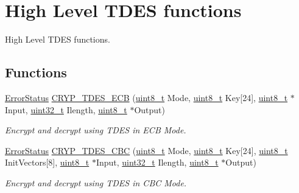 \hypertarget{group___c_r_y_p___group7}{\section{High Level T\-D\-E\-S functions}
\label{group___c_r_y_p___group7}
}


High Level T\-D\-E\-S functions.  


\subsection*{Functions}
\begin{DoxyCompactItemize}
\item 
\hyperlink{group___exported__types_ga8333b96c67f83cba354b3407fcbb6ee8}{Error\-Status} \hyperlink{group___c_r_y_p___group7_ga17c03ab4f0566fcbc3dd8c052e6f9886}{C\-R\-Y\-P\-\_\-\-T\-D\-E\-S\-\_\-\-E\-C\-B} (\hyperlink{stdint_8h_aba7bc1797add20fe3efdf37ced1182c5}{uint8\-\_\-t} Mode, \hyperlink{stdint_8h_aba7bc1797add20fe3efdf37ced1182c5}{uint8\-\_\-t} Key\mbox{[}24\mbox{]}, \hyperlink{stdint_8h_aba7bc1797add20fe3efdf37ced1182c5}{uint8\-\_\-t} $\ast$Input, \hyperlink{stdint_8h_a435d1572bf3f880d55459d9805097f62}{uint32\-\_\-t} Ilength, \hyperlink{stdint_8h_aba7bc1797add20fe3efdf37ced1182c5}{uint8\-\_\-t} $\ast$Output)
\begin{DoxyCompactList}\small\item\em Encrypt and decrypt using T\-D\-E\-S in E\-C\-B Mode. \end{DoxyCompactList}\item 
\hyperlink{group___exported__types_ga8333b96c67f83cba354b3407fcbb6ee8}{Error\-Status} \hyperlink{group___c_r_y_p___group7_gabe52a368c4882450c1e82f16bc1eb686}{C\-R\-Y\-P\-\_\-\-T\-D\-E\-S\-\_\-\-C\-B\-C} (\hyperlink{stdint_8h_aba7bc1797add20fe3efdf37ced1182c5}{uint8\-\_\-t} Mode, \hyperlink{stdint_8h_aba7bc1797add20fe3efdf37ced1182c5}{uint8\-\_\-t} Key\mbox{[}24\mbox{]}, \hyperlink{stdint_8h_aba7bc1797add20fe3efdf37ced1182c5}{uint8\-\_\-t} Init\-Vectors\mbox{[}8\mbox{]}, \hyperlink{stdint_8h_aba7bc1797add20fe3efdf37ced1182c5}{uint8\-\_\-t} $\ast$Input, \hyperlink{stdint_8h_a435d1572bf3f880d55459d9805097f62}{uint32\-\_\-t} Ilength, \hyperlink{stdint_8h_aba7bc1797add20fe3efdf37ced1182c5}{uint8\-\_\-t} $\ast$Output)
\begin{DoxyCompactList}\small\item\em Encrypt and decrypt using T\-D\-E\-S in C\-B\-C Mode. \end{DoxyCompactList}\end{DoxyCompactItemize}


